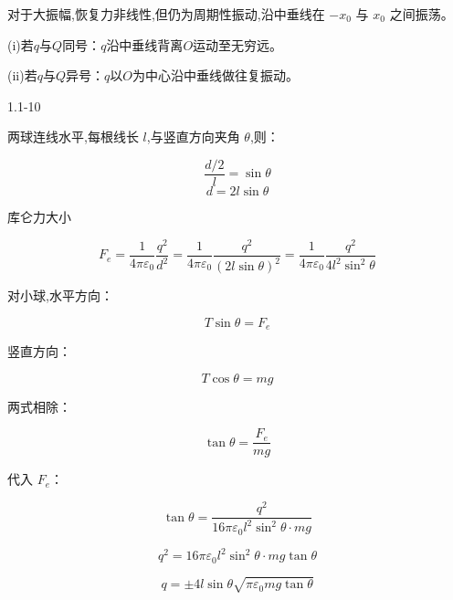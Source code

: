\documentclass{article}
\begin{document}
对于大振幅,恢复力非线性,但仍为周期性振动,沿中垂线在 $ -x_0 $ 与 $ x_0 $ 之间振荡。

(i)若$q$与$Q$同号：$q$沿中垂线背离$O$运动至无穷远。

(ii)若$q$与$Q$异号：$q$以$O$为中心沿中垂线做往复振动。





\newpage

1.1-10

两球连线水平,每根线长 $ l $,与竖直方向夹角 $ \theta $,则：

$$\frac{d/2}{l} = \sin\theta$$
$$d = 2l\sin\theta$$

库仑力大小

$$F_e = \frac{1}{4\pi\varepsilon_0}\frac{q^2}{d^2} = \frac{1}{4\pi\varepsilon_0}\frac{q^2}{(2l\sin\theta)^2} = \frac{1}{4\pi\varepsilon_0}\frac{q^2}{4l^2\sin^2\theta}$$

对小球,水平方向：

$$T\sin\theta = F_e$$

竖直方向：

$$T\cos\theta = mg$$

两式相除：

$$\tan\theta = \frac{F_e}{mg}$$

代入 $ F_e $：

$$\tan\theta = \frac{q^2}{16\pi\varepsilon_0 l^2\sin^2\theta \cdot mg}$$


$$q^2 = 16\pi\varepsilon_0 l^2\sin^2\theta \cdot mg \tan\theta$$

$$q = \pm4l\sin\theta\sqrt{\pi\varepsilon_0mg\tan\theta}$$
\end{document}
